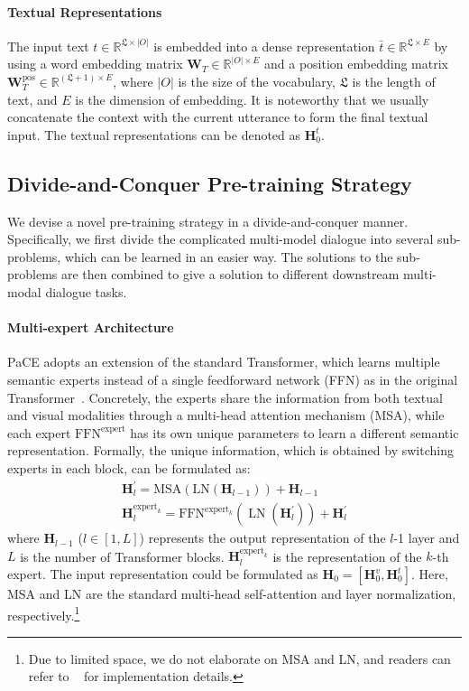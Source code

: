 \documentclass[11pt]{article}
\begin{document}
\paragraph{Textual Representations}
The input text $t \in \mathbb{R}^{\mathfrak{L} \times |O|}$ is embedded into a dense representation $\bar{t} \in \mathbb{R}^{\mathfrak{L} \times E}$ by using a word embedding matrix $\mathbf{W}_T \in \mathbb{R}^{|O| \times E}$ and a position embedding matrix $\mathbf{W}_T^{\text{pos}} \in \mathbb{R}^{(\mathfrak{L}+1) \times E}$, where $|O|$ is the size of the vocabulary, $\mathfrak{L}$ is the length of text, and $E$ is the dimension of embedding. It is noteworthy that we usually concatenate the context with the current utterance to form the final textual input. The textual representations can be denoted as $\boldsymbol{H}_0^t$.

\subsection{Divide-and-Conquer Pre-training Strategy}
We devise a novel pre-training strategy  in a divide-and-conquer manner. 
Specifically, we first divide the complicated multi-model dialogue into several sub-problems, which can be learned in an easier way. The solutions to the sub-problems are then combined to give a solution to different downstream multi-modal dialogue tasks. 


\paragraph{Multi-expert Architecture}
PaCE adopts an extension of the standard Transformer, which learns multiple semantic experts instead of a single feedforward network (FFN) as in the original Transformer~\citep{bao2021vlmo}. Concretely, the experts share the information from both textual and visual modalities through a multi-head attention mechanism (MSA), while each expert $\text{FFN}^\text{expert}$ has its own unique parameters to learn a different semantic representation.
Formally, the unique information, which is obtained by switching experts in each block, can be formulated as:
\begin{equation}
\begin{array}{r}
\boldsymbol{H}_l^{\prime}=\text{MSA}\left(\text{LN}\left(\boldsymbol{H}_{l-1}\right)\right)+\boldsymbol{H}_{l-1} \\
\boldsymbol{H}_l^{\text{expert}_k}=\text{FFN}^{\text{expert}_k}\left(\operatorname{LN}\left(\boldsymbol{H}_l^{\prime}\right)\right)+\boldsymbol{H}_l^{\prime}
\end{array}
\end{equation}
where $\boldsymbol{H}_{l-1}$ ($l \in[1, L]$) represents the output representation of the $l$-1 layer and $L$ is the number of Transformer blocks.
$\boldsymbol{H}_l^{\text{expert}_k}$ is the representation of the $k$-th expert. The input representation could be formulated as
$\boldsymbol{H}_0 = [\boldsymbol{H}_0^v, \boldsymbol{H}_0^t]$.
Here, MSA and LN are the standard multi-head self-attention and layer normalization, respectively.\footnote{Due to limited space, we do not elaborate on MSA and LN, and readers can refer to ~\cite{vaswani2017attention} for implementation details.} 
\end{document}
